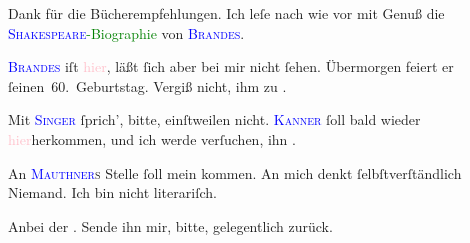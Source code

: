 \pstart
           Dank für die Bücherempfehlungen. Ich leſe nach wie vor mit Genuß die \textcolor{green}{\textsc{\textcolor{blue}{Shakespeare}{}\ledrightnote{\textcolor{blue}{William Shakespeare}}}-Biographie}{}\ledrightnote{\textcolor{green}{William Shakespeare}} von \textsc{\textcolor{blue}{Brandes}{}\ledrightnote{\textcolor{blue}{Georg Brandes}}}.\pend
           
\pstart
           \textsc{\textcolor{blue}{Brandes}{}\ledrightnote{\textcolor{blue}{Georg Brandes}}} iſt \textcolor{pink}{hier}{}\ledrightnote{{$\rightarrow$}\textcolor{pink}{Berlin}}, läßt ſich aber
               bei mir nicht ſehen. Übermorgen feiert \introOben{}er\introOben{} ſeinen 60. Geburtstag. Vergiß nicht, ihm zu \label{K_L03196-5v}\label{K_L03196-5h}.\pend
           
\pstart
           {\pb}Mit \textsc{\textcolor{blue}{Singer}{}\ledrightnote{\textcolor{blue}{Isidor Singer}}} ſprich’, bitte, einſtweilen nicht. \textsc{\textcolor{blue}{Kanner}{}\ledrightnote{\textcolor{blue}{Heinrich Kanner}}} ſoll bald wieder \textcolor{pink}{hier}{}\ledrightnote{{$\rightarrow$}\textcolor{pink}{Berlin}}herkommen, und ich werde verſuchen, ihn \label{K_L03196-6v}\label{K_L03196-6h}.\pend
           
\pstart
           An \textsc{\textcolor{blue}{Mauthner}{}\ledrightnote{\textcolor{blue}{Fritz Mauthner}}s} Stelle ſoll mein \label{K_L03196-7v}\label{K_L03196-7h} kommen. An mich
               denkt ſelbſtverſtändlich Niemand. Ich bin nicht literariſch.\pend
           
\pstart
           Anbei der \label{K_L03196-8v}\label{K_L03196-8h}. Sende ihn mir, bitte, gelegentlich zurück.\pend
           
